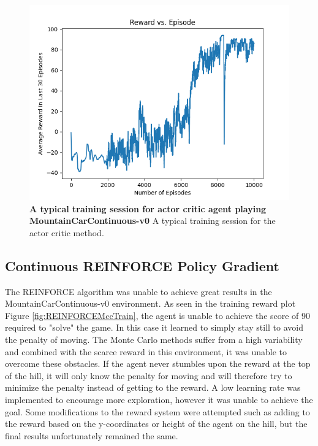 \documentclass[conference]{IEEEtran}
\begin{document}
\begin{figure}[htbp]
\centerline{\includegraphics[scale=0.5]{best_actor_critic_mcc.png}}
\caption{\textbf{A typical training session for actor critic agent playing MountainCarContinuous-v0}  A typical training session for the actor critic method.}
\label{fig:actorCriticGoodTrainingMcc}
\end{figure}

\subsection{Continuous REINFORCE Policy Gradient}
The REINFORCE algorithm was unable to achieve great results in the MountainCarContinuous-v0 environment. As seen in the training reward plot Figure \ref{fig:REINFORCEMccTrain}, the agent is unable to achieve the score of 90 required to "solve" the game. In this case it learned to simply stay still to avoid the penalty of moving. The Monte Carlo methods suffer from a high variability and combined with the scarce reward in this environment, it was unable to overcome these obstacles. If the agent never stumbles upon the reward at the top of the hill, it will only know the penalty for moving and will therefore try to minimize the penalty instead of getting to the reward. A low learning rate was implemented to encourage more exploration, however it was unable to achieve the goal. 
Some modifications to the reward system were attempted such as adding to the reward based on the y-coordinates or height of the agent on the hill, but the final results unfortunately	remained the same. 
\end{document}
